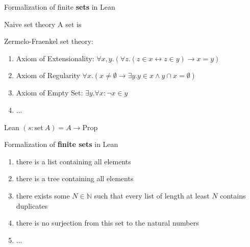 \documentclass{beamer}
\begin{document}
    \begin{frame}{Formalization of finite \textbf{sets} in Lean}
        \begin{block}{Naive set theory}
            A set is 
        \end{block}
        \begin{block}{Zermelo-Fraenkel set theory:}
        \begin{enumerate}
            \item Axiom of Extensionality:
            $\forall x, y.(\forall z. (z \in x \leftrightarrow z \in y) \rightarrow x=y)$
            
            \item Axiom of Regularity 
            $\forall x. (x \neq \emptyset \rightarrow \exists y. y \in x \land y \cap x = \emptyset ) $
            
            \item Axiom of Empty Set: $\exists y. \forall x: \neg x \in y$
            \item ...
            
        \end{enumerate}
        \end{block}
        \pause
        \begin{block}{Lean}
        $(s: \text{{set}}\ A) = A \to \text{{Prop}}$
        \end{block}
    \end{frame}
    \begin{frame}{Formalization of \textbf{finite sets} in Lean}
        \begin{enumerate}[<+->]
            \item there is a list containing all elements
            \item there is a tree containing all elements
            \item there exists some $N \in \mathbb{N}$ such that every list of length at least $N$ contains duplicates
            \item there is no surjection from this set to the natural numbers
            \item ...
        \end{enumerate}
    \end{frame}
\end{document}
